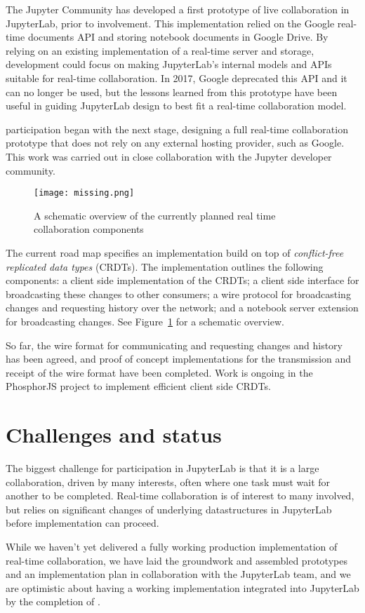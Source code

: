 \documentclass{deliverablereport}
\begin{document}
The Jupyter Community has developed a first prototype of live collaboration in JupyterLab,
prior to \ODK involvement.
This implementation relied on the Google real-time documents API and storing notebook documents in Google Drive.
By relying on an existing implementation of a real-time server and storage,
development could focus on making JupyterLab's
internal models and APIs suitable for real-time collaboration.
In 2017, Google deprecated this API and it can no longer be used,
but the lessons learned from this prototype have been useful in guiding JupyterLab design to best fit a real-time collaboration model.

\ODK participation began with the next stage, designing a full real-time collaboration prototype
that does not rely on any external hosting provider,
such as Google.
This work was carried out in close collaboration with the Jupyter developer community.




\begin{figure}[h]
  \centering
  \texttt{[image: missing.png]}
  \caption{A schematic overview of the currently planned real time collaboration components}
  \label{fig:rtc-components}
\end{figure}

The current road map specifies an implementation build on top of
\emph{conflict-free replicated data types} (CRDTs). The implementation outlines the
following components: a client side implementation of the CRDTs; a client side interface
for broadcasting these changes to other consumers; a wire protocol for broadcasting
changes and requesting history over the network; and a notebook server extension for broadcasting changes. See Figure~\ref{fig:rtc-components} for a schematic overview.

So far, the wire format for communicating and requesting changes and history has been
agreed, and proof of concept implementations for the transmission and receipt of the
wire format have been completed. Work is ongoing in the PhosphorJS project to implement
efficient client side CRDTs.


\section{Challenges and status}

The biggest challenge for \ODK participation in JupyterLab is that it is a large collaboration, driven by many interests,
often where one task must wait for another to be completed.
Real-time collaboration is of interest to many involved,
but relies on significant changes of underlying datastructures in JupyterLab before implementation can proceed.

While we haven't yet delivered a fully working production implementation of real-time collaboration,
we have laid the groundwork and assembled prototypes and an implementation plan
in collaboration with the JupyterLab team,
and we are optimistic about having a working implementation integrated into JupyterLab by the completion of .
\end{document}
